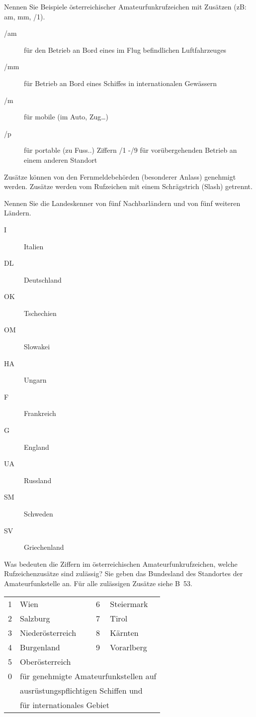 \documentclass[avery5371,grid,frame,a4paper]{flashcards}
\newcommand{\card}[3]{
  \begin{flashcard}[{\chap} -- #1]{#2}#3\end{flashcard}
}
\begin{document}
\card{53}{Nennen Sie Beispiele österreichischer Amateurfunkrufzeichen mit Zusätzen (zB: am, mm, /1).}{
  \footnotesize
  \begin{description}
    \item[/am] für den Betrieb an Bord eines im Flug befindlichen Luftfahrzeuges
    \item[/mm] für Betrieb an Bord eines Schiffes in internationalen Gewässern
    \item[/m] für mobile (im Auto, Zug…)
    \item[/p] für portable (zu Fuss..)  Ziffern /1 -/9 für vorübergehenden Betrieb an einem anderen Standort
  \end{description}
  Zusätze können von den Fernmeldebehörden (besonderer Anlass) genehmigt werden.
  Zusätze werden vom Rufzeichen mit einem Schrägstrich (Slash) getrennt.
}
\card{54}{Nennen Sie die Landeskenner von fünf Nachbarländern und von fünf weiteren Ländern.}{
  \begin{minipage}{0.48\textwidth}
    \begin{description}
      \item[I] Italien
      \item[DL] Deutschland
      \item[OK] Tschechien
      \item[OM] Slowakei
      \item[HA] Ungarn
    \end{description}
  \end{minipage}
  \begin{minipage}{0.5\textwidth}
    \begin{description}
      \item[F] Frankreich
      \item[G] England
      \item[UA] Russland
      \item[SM] Schweden
      \item[SV] Griechenland
    \end{description}
  \end{minipage}
}
\card{55}{Was bedeuten die Ziffern im österreichischen Amateurfunkrufzeichen, welche Rufzeichenzusätze sind zulässig?}{
  Sie geben das Bundesland des Standortes der Amateurfunkstelle an. Für alle zulässigen Zusätze siehe B~53.

  \begin{tabular}{llll}
    1 & Wien               & 6 & Steiermark \\
    2 & Salzburg           & 7 & Tirol \\
    3 & Niederösterreich   & 8 & Kärnten \\
    4 & Burgenland         & 9 & Vorarlberg \\
    5 & Oberösterreich     &   & \\
    0 & \multicolumn{3}{l}{für genehmigte Amateurfunkstellen auf} \\
      & \multicolumn{3}{l}{ausrüstungspflichtigen Schiffen und} \\
      & \multicolumn{3}{l}{für internationales Gebiet} \\
  \end{tabular}
}
\end{document}

